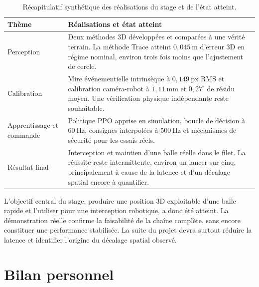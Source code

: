 \documentclass[a4paper,11pt]{report}
\begin{document}
\begin{table}[H]
  \centering
  \caption{Récapitulatif synthétique des réalisations du stage et de l'état atteint.}
  \label{tab:bilan-realisations}
  \scriptsize
  \begin{tabular}{L{0.32\textwidth}L{0.60\textwidth}}
    \toprule
    Thème & Réalisations et état atteint \\
    \midrule
    Perception & Deux méthodes 3D développées et comparées à une vérité terrain. La méthode Trace atteint \(0{,}045~\text{m}\) d'erreur 3D en régime nominal, environ trois fois moins que l'ajustement de cercle. \\
    Calibration & Mire événementielle intrinsèque à \(0{,}149~\text{px}\) RMS et calibration caméra-robot à \(1{,}11~\text{mm}\) et \(0{,}27^\circ\) de résidu moyen. Une vérification physique indépendante reste souhaitable. \\
    Apprentissage et commande & Politique PPO apprise en simulation, boucle de décision à \(60~\text{Hz}\), consignes interpolées à \(500~\text{Hz}\) et mécanismes de sécurité pour les essais réels. \\
    Résultat final & Interception et maintien d'une balle réelle dans le filet. La réussite reste intermittente, environ un lancer sur cinq, principalement à cause de la latence et d'un décalage spatial encore à quantifier. \\
    \bottomrule
  \end{tabular}
\end{table}

L'objectif central du stage, produire une position 3D exploitable d'une balle
rapide et l'utiliser pour une interception robotique, a donc été atteint. La
démonstration réelle confirme la faisabilité de la chaîne complète, sans encore
constituer une performance stabilisée. La suite du projet devra surtout réduire
la latence et identifier l'origine du décalage spatial observé.

\section*{Bilan personnel}
\end{document}
